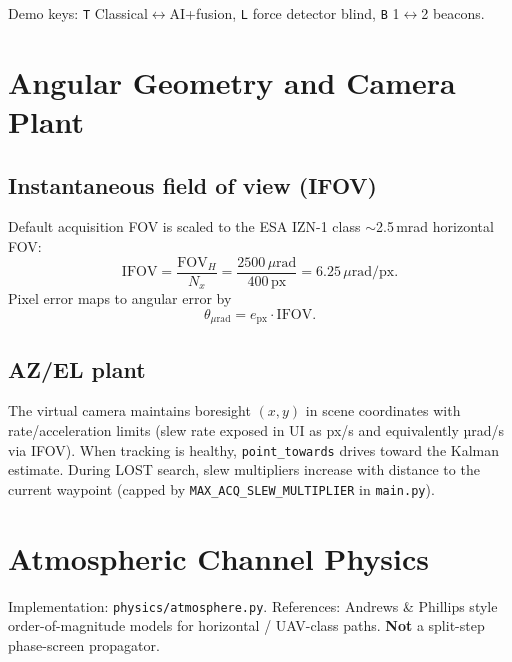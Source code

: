 \documentclass[11pt,a4paper]{article}
\begin{document}
Demo keys: \texttt{T} Classical$\leftrightarrow$AI+fusion, \texttt{L} force detector blind, \texttt{B} 1$\leftrightarrow$2 beacons.

\section{Angular Geometry and Camera Plant}

\subsection{Instantaneous field of view (IFOV)}
Default acquisition FOV is scaled to the ESA IZN-1 class $\sim$2.5\,mrad horizontal FOV:
\begin{equation}
\mathrm{IFOV}
= \frac{\mathrm{FOV}_{H}}{N_{x}}
= \frac{2500\,\mu\mathrm{rad}}{400\,\mathrm{px}}
= 6.25\,\mu\mathrm{rad/px}.
\end{equation}
Pixel error maps to angular error by
\begin{equation}
\theta_{\mu\mathrm{rad}} = e_{\mathrm{px}} \cdot \mathrm{IFOV}.
\end{equation}

\subsection{AZ/EL plant}
The virtual camera maintains boresight $(x,y)$ in scene coordinates with rate/acceleration limits (slew rate exposed in UI as px/s and equivalently µrad/s via IFOV).
When tracking is healthy, \texttt{point\_towards} drives toward the Kalman estimate.
During LOST search, slew multipliers increase with distance to the current waypoint (capped by \texttt{MAX\_ACQ\_SLEW\_MULTIPLIER} in \texttt{main.py}).

\section{Atmospheric Channel Physics}

Implementation: \texttt{physics/atmosphere.py}.
References: Andrews \& Phillips style order-of-magnitude models for horizontal / UAV-class paths.
\textbf{Not} a split-step phase-screen propagator.
\end{document}
